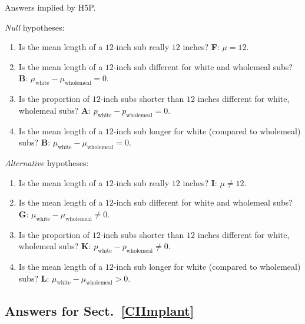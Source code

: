 \documentclass[
  11pt,
  a4paper,
  krantz2]{krantz}
\providecommand{\tightlist}{%
  \setlength{\itemsep}{0pt}\setlength{\parskip}{0pt}}
\begin{document}
\begin{footnotesize}
Answers implied by H5P.

\emph{Null} hypotheses:

\begin{enumerate}
\def\labelenumi{\arabic{enumi}.}
\tightlist
\item
  Is the mean length of a \(12\)-inch sub really \(12\) inches?
  \textbf{F}: \(\mu = 12\).
\item
  Is the mean length of a \(12\)-inch sub different for white and wholemeal subs?
  \textbf{B}: \(\mu_{\text{white}} - \mu_{\text{wholemeal}} = 0\).
\item
  Is the proportion of \(12\)-inch subs shorter than \(12\) inches different for white, wholemeal subs?
  \textbf{A}: \(p_{\text{white}} - p_{\text{wholemeal}} = 0\).
\item
  Is the mean length of a \(12\)-inch sub longer for white (compared to wholemeal) subs?
  \textbf{B}: \(\mu_{\text{white}} - \mu_{\text{wholemeal}} = 0\).
\end{enumerate}

\emph{Alternative} hypotheses:

\begin{enumerate}
\def\labelenumi{\arabic{enumi}.}
\tightlist
\item
  Is the mean length of a \(12\)-inch sub really \(12\) inches?
  \textbf{I}: \(\mu \ne 12\).
\item
  Is the mean length of a \(12\)-inch sub different for white and wholemeal subs?
  \textbf{G}: \(\mu_{\text{white}} - \mu_{\text{wholemeal}} \ne  0\).
\item
  Is the proportion of \(12\)-inch subs shorter than \(12\) inches different for white, wholemeal subs?
  \textbf{K}: \(p_{\text{white}} - p_{\text{wholemeal}}\ne 0\).
\item
  Is the mean length of a \(12\)-inch sub longer for white (compared to wholemeal) subs?
  \textbf{L}: \(\mu_{\text{white}} - \mu_{\text{wholemeal}} > 0\).
\end{enumerate}

\subsection*{Answers for Sect.~\ref{CIImplant}}\label{answers-for-sect.-refciimplant}


\end{footnotesize}
\end{document}
